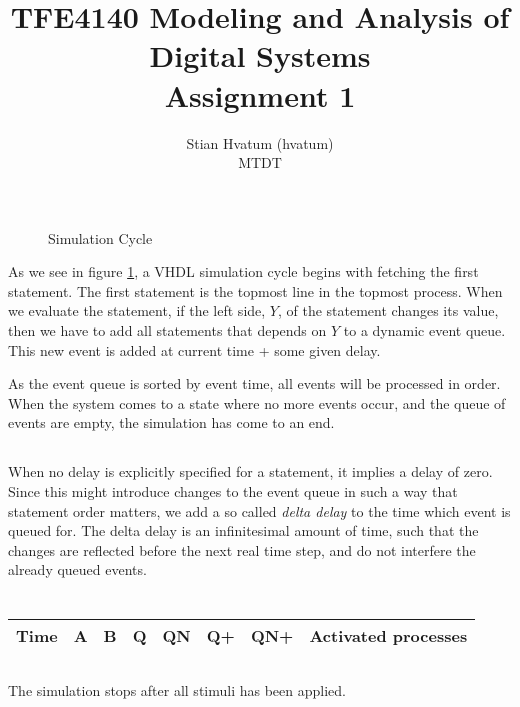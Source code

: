 \documentclass[english,a4paper]{report}
\title{TFE4140 Modeling and Analysis of Digital Systems\\
\Huge Assignment 1}
\author{Stian Hvatum (hvatum)\\MTDT}
\begin{document}
\maketitle
\tableofcontents
\newpage
\section{}
\subsection{}
\subsection{}
\begin{figure}

\caption{Simulation Cycle}
\label{dia:simcycle}
\end{figure}
As we see in figure \ref{dia:simcycle}, a VHDL simulation cycle begins with fetching the first statement.
The first statement is the topmost line in the topmost process.
When we evaluate the statement, if the left side, $Y$, of the statement changes its value, then we have to add
all statements that depends on $Y$ to a dynamic event queue. This new event is added at current time + some given delay.

As the event queue is sorted by event time, all events will be processed in order. When the system comes to a state where no more
events occur, and the queue of events are empty, the simulation has come to an end.

\subsection{}
When no delay is explicitly specified for a statement, it implies a delay of zero. Since this might introduce changes to the
event queue in such a way that statement order matters, we add a so called \textit{delta delay} to the time which event is queued for.
The delta delay is an infinitesimal amount of time, such that the changes are reflected before the next real time step,
and do not interfere the already queued events.

\section{}
\subsection{}
\begin{tabular}{|c|c|c|c|c|c|c|c|}
    \hline
    Time	&A	&B	&Q	&QN	&Q+	&QN+	&Activated processes\\
    \hline
    
    \hline
\end{tabular}
\subsection{}
The simulation stops after all stimuli has been applied.

\subsection{}

\end{document}
